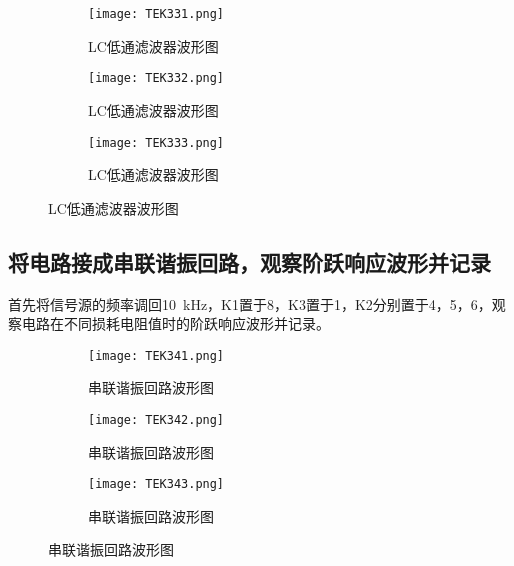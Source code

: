 \begin{figure}[htpb]
	\centering
	\begin{subfigure}[htpb]{.31\linewidth}
		\centering
		\texttt{[image: TEK331.png]}
		\caption{LC低通滤波器波形图}
		\label{fig:LC低通滤波器波形图\arabic{subfigure}}
	\end{subfigure}
	\quad
	\begin{subfigure}[htpb]{.31\linewidth}
		\centering
		\texttt{[image: TEK332.png]}
		\caption{LC低通滤波器波形图}
		\label{fig:LC低通滤波器波形图\arabic{subfigure}}
	\end{subfigure}
	\quad
	\begin{subfigure}[htpb]{.31\linewidth}
		\centering
		\texttt{[image: TEK333.png]}
		\caption{LC低通滤波器波形图}
		\label{fig:LC低通滤波器波形图\arabic{subfigure}}
	\end{subfigure}
	\caption{LC低通滤波器波形图}
	\label{fig:LC低通滤波器波形图}
\end{figure}

\subsection{将电路接成串联谐振回路，观察阶跃响应波形并记录}%
\label{sub:将电路接成串联谐振回路，观察阶跃响应波形并记录}

首先将信号源的频率调回\SI{10}{kHz}，K1置于8，K3置于1，K2分别置于4，5，6，观察电路在不同损耗电阻值时的阶跃响应波形并记录。

\begin{figure}[htpb]
	\centering
	\begin{subfigure}[htpb]{.31\linewidth}
		\centering
		\texttt{[image: TEK341.png]}
		\caption{串联谐振回路波形图}
		\label{fig:串联谐振回路波形图\arabic{subfigure}}
	\end{subfigure}
	\quad
	\begin{subfigure}[htpb]{.31\linewidth}
		\centering
		\texttt{[image: TEK342.png]}
		\caption{串联谐振回路波形图}
		\label{fig:串联谐振回路波形图\arabic{subfigure}}
	\end{subfigure}
	\quad
	\begin{subfigure}[htpb]{.31\linewidth}
		\centering
		\texttt{[image: TEK343.png]}
		\caption{串联谐振回路波形图}
		\label{fig:串联谐振回路波形图\arabic{subfigure}}
	\end{subfigure}
	\caption{串联谐振回路波形图}
	\label{fig:串联谐振回路波形图}
\end{figure}

